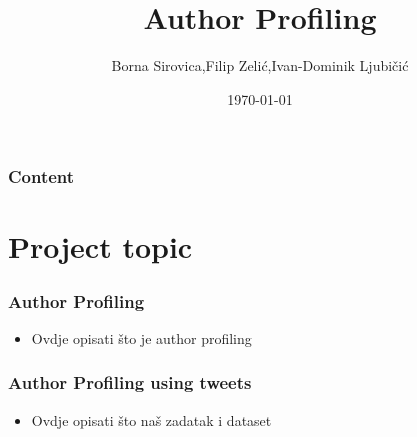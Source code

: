 \documentclass[slidestop,compress,11pt,xcolor=dvipsnames]{beamer}
\title[Author Profiling]{Author Profiling} %
\author{Borna Sirovica,Filip Zelić,Ivan-Dominik Ljubičić} %
\institute[FER] %
{
Fakultet elektrotehnike i računarstva \\ %
\medskip

}
\date{\today} %
\begin{document}
\begin{frame}
\titlepage %
\end{frame}

\begin{frame}
\frametitle{Content} %
\tableofcontents %
\end{frame}


\section{Project topic} %

\begin{frame}
\frametitle{Author Profiling}
\begin{itemize}
	\item Ovdje opisati što je author profiling
\end{itemize}

\end{frame}






\begin{frame}
\frametitle{Author Profiling using tweets}
\begin{itemize}
	\item Ovdje opisati što naš zadatak i dataset
\end{itemize}
\end{frame}
\end{document}
